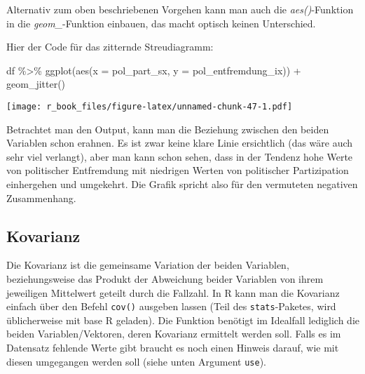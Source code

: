 \documentclass[
]{book}
\newenvironment{Shaded}{\begin{snugshade}}{\end{snugshade}}
\newcommand{\AttributeTok}[1]{\textcolor[rgb]{0.77,0.63,0.00}{#1}}
\newcommand{\FunctionTok}[1]{\textcolor[rgb]{0.00,0.00,0.00}{#1}}
\newcommand{\NormalTok}[1]{#1}
\newcommand{\SpecialCharTok}[1]{\textcolor[rgb]{0.00,0.00,0.00}{#1}}
\begin{document}
Alternativ zum oben beschriebenen Vorgehen kann man auch die \emph{aes()}-Funktion in die \emph{geom\_}-Funktion einbauen, das macht optisch keinen Unterschied.

Hier der Code für das zitternde Streudiagramm:

\begin{Shaded}
\begin{Highlighting}[]
\NormalTok{df }\SpecialCharTok{\%\textgreater{}\%} 
  \FunctionTok{ggplot}\NormalTok{(}\FunctionTok{aes}\NormalTok{(}\AttributeTok{x =}\NormalTok{ pol\_part\_sx, }\AttributeTok{y =}\NormalTok{ pol\_entfremdung\_ix)) }\SpecialCharTok{+}
  \FunctionTok{geom\_jitter}\NormalTok{() }
\end{Highlighting}
\end{Shaded}

\texttt{[image: r\_book\_files/figure-latex/unnamed-chunk-47-1.pdf]}

Betrachtet man den Output, kann man die Beziehung zwischen den beiden Variablen schon erahnen. Es ist zwar keine klare Linie ersichtlich (das wäre auch sehr viel verlangt), aber man kann schon sehen, dass in der Tendenz hohe Werte von politischer Entfremdung mit niedrigen Werten von politischer Partizipation einhergehen und umgekehrt. Die Grafik spricht also für den vermuteten negativen Zusammenhang.

\hypertarget{kovarianz}{%
\subsection{Kovarianz}\label{kovarianz}}

Die Kovarianz ist die gemeinsame Variation der beiden Variablen, beziehungsweise das Produkt der Abweichung beider Variablen von ihrem jeweiligen Mittelwert geteilt durch die Fallzahl. In R kann man die Kovarianz einfach über den Befehl \texttt{cov()} ausgeben lassen (Teil des \texttt{stats}-Paketes, wird üblicherweise mit base R geladen). Die Funktion benötigt im Idealfall lediglich die beiden Variablen/Vektoren, deren Kovarianz ermittelt werden soll. Falls es im Datensatz fehlende Werte gibt braucht es noch einen Hinweis darauf, wie mit diesen umgegangen werden soll (siehe unten Argument \texttt{use}).

\begin{Shaded}
\end{Shaded}
\end{document}
